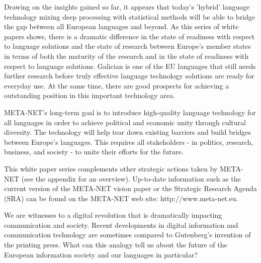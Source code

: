 \begin{multicols}{2}
\begin{itemize}
\begin{multicols}{2}

    Drawing on the insights gained so far, it appears that today’s 'hybrid' language technology mixing deep processing with statistical methods will be able to bridge the gap between all European languages and beyond. As this series of white papers shows, there is a dramatic difference in the state of readiness with respect to language solutions and the state of research between Europe’s member states in terms of both the maturity of the research and in the state of readiness with respect to language solutions. Galician is one of the EU languages that still needs further research before truly effective language technology solutions are ready for everyday use. At the same time, there are good prospects for achieving a outstanding position in this important technology area. 

    META-NET’s long-term goal is to introduce high-quality language technology for all languages in order to achieve political and economic unity through cultural diversity. The technology will help tear down existing barriers and build bridges between Europe’s languages. This requires all stakeholders - in politics, research, business, and society - to unite their efforts for the future.

    This white paper series complements other strategic actions taken by META-NET (see the appendix for an overview). Up-to-date information such as the current version of the META-NET vision paper \cite{Meta1} or the Strategic Research Agenda (SRA) can be found on the META-NET web site: http://www.meta-net.eu.
\end{multicols}

\clearpage



\begin{multicols}{2}

    We are witnesses to a digital revolution that is dramatically impacting communication and society. Recent developments in digital information and communication technology are sometimes compared to Gutenberg’s invention of the printing press. What can this analogy tell us about the future of the European information society and our languages in particular?


\end{multicols}
\end{itemize}
\end{multicols}
